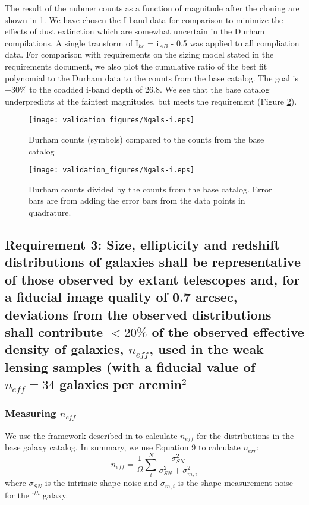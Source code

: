 \documentclass[]{article}
\begin{document}
The result of the nubmer counts as a function of magnitude after the cloning are shown in \ref{fig:gcounts}.  We have chosen the I-band data for comparison to 
minimize the effects of dust extinction which are somewhat uncertain in the Durham compilations.  A single transform of I$_{kc}$ = i$_{AB}$ - 0.5 was applied to
all compliation data.  For comparison with requirements on the sizing model stated in the requirements document, we also plot the cumulative ratio of the best fit polynomial
to the Durham data to the counts from the base catalog.  The goal is $\pm30\%$ to the coadded i-band depth of 26.8.  We see that the base catalog
underpredicts at the faintest magnitudes, but meets the requirement (Figure \ref{fig:gratio}).

\begin{figure}
\centering
\texttt{[image: validation\_figures/Ngals-i.eps]}
\caption{Durham counts (symbols) compared to the counts from the base catalog \label{fig:gcounts}}
\end{figure}
\begin{figure}
\centering
\texttt{[image: validation\_figures/Ngals-i.eps]}
\caption{Durham counts divided by the counts from the base catalog.  Error bars are from adding the error bars from the data points in quadrature. \label{fig:gratio}}
\end{figure}

\subsection{Requirement 3: Size, ellipticity and redshift distributions of galaxies shall be representative of those observed by extant
telescopes and, for a fiducial image quality of 0.7 arcsec, deviations from the observed distributions shall
contribute $< 20\%$ of the observed effective density of galaxies, $n_{eff}$, used in the weak lensing samples (with a fiducial value of
$n_{eff} = 34$ galaxies per arcmin$^2$}
\subsubsection{Measuring $n_{eff}$}
We use the framework described in \cite{chang} to calculate $n_{eff}$ for the distributions in the 
base galaxy catalog.  In summary, we use Equation 9 to calculate $n_{err}$:
\begin{equation}
n_{eff} = \frac{1}{\Omega}\sum^N_i\frac{\sigma^2_{SN}}{\sigma^2_{SN}+\sigma^2_{m,i}}
\end{equation}
where $\sigma_{SN}$ is the intrinsic shape noise and $\sigma_{m,i}$ is the shape measurement noise for the i$^{th}$ galaxy.
\end{document}
